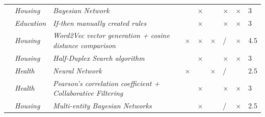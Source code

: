 \begin{table}
{\begin{tabular}{M{3.5cm}M{2.2cm}M{4cm}M{.5cm}M{.5cm}M{.5cm}M{.5cm}M{.5cm}M{1.5cm}}
\cite{dimitrovetal}     & \textit{Housing}                  & \textit{Bayesian Network} \citep{bayesiannetwork}                                             &                      &$\times$                         &                                 &$\times$                                 &$\times$                        & 3                      \\ 
\cite{duyenandnhon}      & \textit{Education}                & \textit{If-then manually created rules}                              &                      &$\times$                         &                                 &$\times$                                 &$\times$                        & 3                      \\ 
\cite{fastetal}         & \textit{Housing}                  & \textit{Word2Vec vector generation + cosine distance comparison}     &$\times$                    &$\times$                         &$\times$                               & /                                 &$\times$                        & 4.5                    \\ 
\cite{haoetal}          & \textit{Housing}                  & \textit{Half-Duplex Search algorithm}                                &                      &$\times$                         &                                 &$\times$                                 &$\times$                        & 3                      \\ 
\cite{kimandchung}       & \textit{Health}                   & \textit{Neural Network}                                              &$\times$                    &                           &$\times$                               & /                                 &                          & 2.5                    \\ 
\cite{KimandChang}       & \textit{Health}                   & \textit{Pearson's correlation coefficient + Collaborative Filtering} \citep{pearsoncorrelation,collaborativefiltering,collaborativefiltering2} &                      &$\times$                         &                                 &$\times$                                 &$\times$                        & 3                      \\ 
\cite{machadoetal}      & \textit{Housing}                  & \textit{Multi-entity Bayesian Networks} \citep{mebn}                              &                      &$\times$                         &                                 & /                                 &$\times$                        & 2.5                    \\ 

\end{tabular}}
\end{table}
